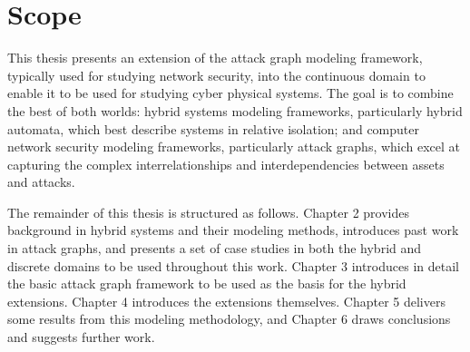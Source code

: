 \section{Scope}
This thesis presents an extension of the attack graph modeling framework, typically used for studying
network security, into the continuous domain to enable it to be used for studying cyber
physical systems. The goal is to combine the best of both worlds: hybrid systems
modeling frameworks, particularly hybrid automata, which best describe systems in 
relative isolation; and computer network security modeling frameworks, particularly attack graphs,
which excel at capturing the complex interrelationships and interdependencies between assets and
attacks.

The remainder of this thesis is structured as follows. Chapter 2 provides background in hybrid systems
and their modeling methods, introduces past work in attack graphs, and presents a set of case studies
in both the hybrid and discrete domains to be used throughout this work. Chapter 3 introduces in detail
the basic attack graph framework to be used as the basis for the hybrid extensions. Chapter 4
introduces the extensions themselves. Chapter 5 delivers some results from this modeling methodology,
and Chapter 6 draws conclusions and suggests further work.